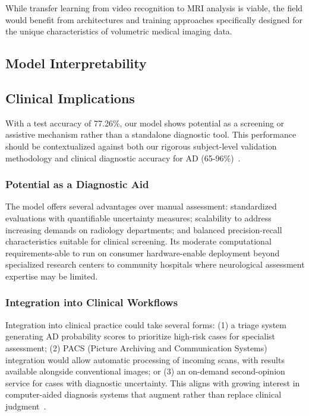 \documentclass[12pt, a4paper]{article}
\begin{document}
While transfer learning from video recognition to MRI analysis is viable, the field would benefit from architectures and training approaches specifically designed for the unique characteristics of volumetric medical imaging data.

\subsection{Model Interpretability}

\subsection{Clinical Implications}

With a test accuracy of 77.26\%, our model shows potential as a screening or assistive mechanism rather than a standalone diagnostic tool. This performance should be contextualized against both our rigorous subject-level validation methodology and clinical diagnostic accuracy for AD (65-96\%)~\cite{kloppel2008accuracy}.

\subsubsection{Potential as a Diagnostic Aid}

The model offers several advantages over manual assessment: standardized evaluations with quantifiable uncertainty measures; scalability to address increasing demands on radiology departments; and balanced precision-recall characteristics suitable for clinical screening. Its moderate computational requirements-able to run on consumer hardware-enable deployment beyond specialized research centers to community hospitals where neurological assessment expertise may be limited.

\subsubsection{Integration into Clinical Workflows}

Integration into clinical practice could take several forms: (1) a triage system generating AD probability scores to prioritize high-risk cases for specialist assessment; (2) PACS (Picture Archiving and Communication Systems) integration would allow automatic processing of incoming scans, with results available alongside conventional images; or (3) an on-demand second-opinion service for cases with diagnostic uncertainty. This aligns with growing interest in computer-aided diagnosis systems that augment rather than replace clinical judgment~\cite{kloppel2008accuracy}.
\end{document}
